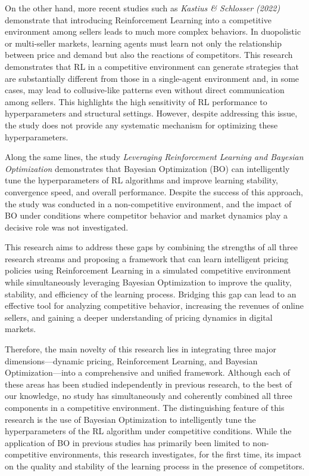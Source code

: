 \documentclass[11pt,a4paper]{article}
\begin{document}
\begin{tcolorbox}
On the other hand, more recent studies such as \textit{Kastius \& Schlosser (2022)} demonstrate that introducing Reinforcement Learning into a competitive environment among sellers leads to much more complex behaviors. In duopolistic or multi-seller markets, learning agents must learn not only the relationship between price and demand but also the reactions of competitors. This research demonstrates that RL in a competitive environment can generate strategies that are substantially different from those in a single-agent environment and, in some cases, may lead to collusive-like patterns even without direct communication among sellers. This highlights the high sensitivity of RL performance to hyperparameters and structural settings. However, despite addressing this issue, the study does not provide any systematic mechanism for optimizing these hyperparameters.

Along the same lines, the study \textit{Leveraging Reinforcement Learning and Bayesian Optimization} demonstrates that Bayesian Optimization (BO) can intelligently tune the hyperparameters of RL algorithms and improve learning stability, convergence speed, and overall performance. Despite the success of this approach, the study was conducted in a non-competitive environment, and the impact of BO under conditions where competitor behavior and market dynamics play a decisive role was not investigated.

This research aims to address these gaps by combining the strengths of all three research streams and proposing a framework that can learn intelligent pricing policies using Reinforcement Learning in a simulated competitive environment while simultaneously leveraging Bayesian Optimization to improve the quality, stability, and efficiency of the learning process. Bridging this gap can lead to an effective tool for analyzing competitive behavior, increasing the revenues of online sellers, and gaining a deeper understanding of pricing dynamics in digital markets.

Therefore, the main novelty of this research lies in integrating three major dimensions---dynamic pricing, Reinforcement Learning, and Bayesian Optimization---into a comprehensive and unified framework. Although each of these areas has been studied independently in previous research, to the best of our knowledge, no study has simultaneously and coherently combined all three components in a competitive environment. The distinguishing feature of this research is the use of Bayesian Optimization to intelligently tune the hyperparameters of the RL algorithm under competitive conditions. While the application of BO in previous studies has primarily been limited to non-competitive environments, this research investigates, for the first time, its impact on the quality and stability of the learning process in the presence of competitors.


\end{tcolorbox}
\end{document}
